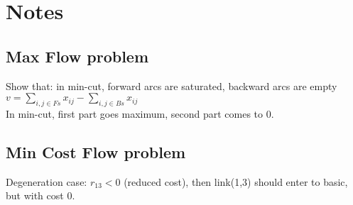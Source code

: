 \documentclass[a4paper]{article}
\begin{document}
\section{Notes}
\subsection{Max Flow problem}
Show that: in min-cut, forward arcs are saturated, backward arcs are empty\\
$v = \sum_{i,j \in Fs}{x_{ij}} - \sum_{i,j \in Bs}{x_{ij}}$\\
In min-cut, first part goes maximum, second part comes to 0.
\subsection{Min Cost Flow problem}
Degeneration case: $r_{13} < 0$ (reduced cost), then link(1,3) should enter to basic, but with cost 0.

\newpage
\end{document}
